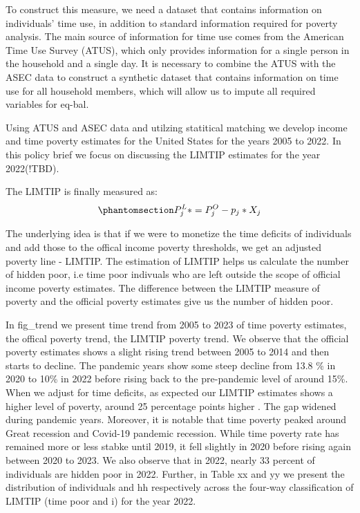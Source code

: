 \documentclass[
  11pt,
]{article}
\begin{document}
To construct this measure, we need a dataset that contains information
on individuals' time use, in addition to standard information required
for poverty analysis. The main source of information for time use comes
from the American Time Use Survey (ATUS), which only provides
information for a single person in the household and a single day. It is
necessary to combine the ATUS with the ASEC data to construct a
synthetic dataset that contains information on time use for all
household members, which will allow us to impute all required variables
for eq-bal.

Using ATUS and ASEC data and utilzing statitical matching we develop
income and time poverty estimates for the United States for the years
2005 to 2022. In this policy brief we focus on discussing the LIMTIP
estimates for the year 2022(!TBD).

The LIMTIP is finally measured as:
\begin{equation}\phantomsection\label{eq-limtip}{P_{j}^L* = P_{j}^O- p_{j}*X_{j}
}\end{equation}

The underlying idea is that if we were to monetize the time deficits of
individuals and add those to the offical income poverty thresholds, we
get an adjusted poverty line - LIMTIP. The estimation of LIMTIP helps us
calculate the number of hidden poor, i.e time poor indivuals who are
left outside the scope of official income poverty estimates. The
difference between the LIMTIP measure of poverty and the official
poverty estimates give us the number of hidden poor.

In fig\_trend we present time trend from 2005 to 2023 of time poverty
estimates, the offical poverty trend, the LIMTIP poverty trend. We
observe that the official poverty estimates shows a slight rising trend
between 2005 to 2014 and then starts to decline. The pandemic years show
some steep decline from 13.8 \% in 2020 to 10\% in 2022 before rising
back to the pre-pandemic level of around 15\%. When we adjust for time
deficits, as expected our LIMTIP estimates shows a higher level of
poverty, around 25 percentage points higher . The gap widened during
pandemic years. Moreover, it is notable that time poverty peaked around
Great recession and Covid-19 pandemic recession. While time poverty rate
has remained more or less stabke until 2019, it fell slightly in 2020
before rising again between 2020 to 2023. We also observe that in 2022,
nearly 33 percent of individuals are hidden poor in 2022. Further, in
Table xx and yy we present the distribution of individuals and hh
respectively across the four-way classification of LIMTIP (time poor and
i) for the year 2022.
\end{document}
